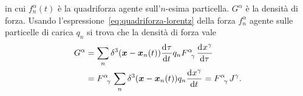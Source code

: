 in cui $f_{n}^{\alpha}(t)$ è la quadriforza agente sull'$n$-esima particella.
$G^{\alpha}$ è la densità di forza.  Usando
l'espressione~\eqref{eq:quadriforza-lorentz} della forza $f_{n}^{\alpha}$ agente
sulle particelle di carica $q_{n}$ si trova che la densità di forza vale
\begin{equation}
  \begin{split}
    G^{\alpha} &= \sum_{n} \delta^{3}(\bm{x} - \bm{x}_{n}(t))
    \toder{\tau}{t}q_{n} \tensor{F}{^{\alpha}_{\gamma}} \toder{x^{\gamma}}{\tau} \\
    &= \tensor{F}{^{\alpha}_{\gamma}} \sum_{n} \delta^{3}(\bm{x} - \bm{x}_{n}(t))
    q_{n} \toder{x^{\gamma}}{t} = \tensor{F}{^{\alpha}_{\gamma}} J^{\gamma}.
  \end{split}
\end{equation}




